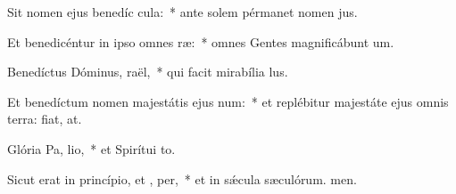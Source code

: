 \item Sit nomen ejus benedíc  cula:~* ante solem pérmanet nomen jus.
\item Et benedicéntur in ipso omnes  ræ:~* omnes Gentes magnificábunt um.
\item Benedíctus Dóminus,  raël,~* qui facit mirabília lus.
\item Et benedíctum nomen majestátis ejus  num:~* et replébitur majestáte ejus omnis terra: fiat, at.
\item Glória Pa,  lio,~* et Spirítui to.
\item Sicut erat in princípio, et ,  per,~* et in sǽcula sæculórum. men.
